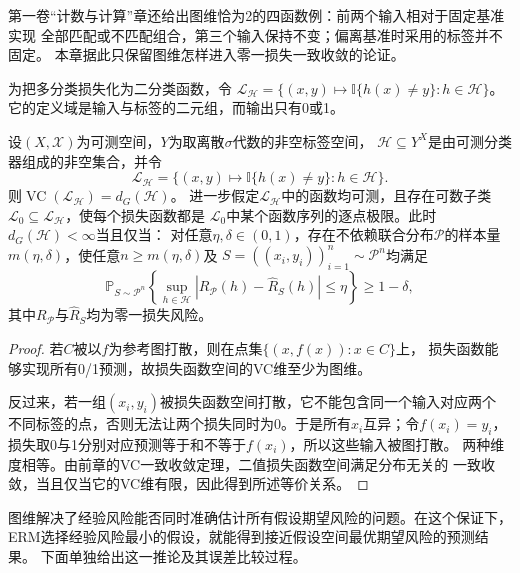 第一卷“计数与计算”章还给出图维恰为2的四函数例：前两个输入相对于固定基准实现
全部匹配或不匹配组合，第三个输入保持不变；偏离基准时采用的标签并不固定。
本章据此只保留图维怎样进入零一损失一致收敛的论证。

为把多分类损失化为二分类函数，令
$\mathcal L_{\mathcal H}=\{(x,y)\mapsto\mathbb I\{h(x)\neq y\}:h\in\mathcal H\}$。
它的定义域是输入与标签的二元组，而输出只有0或1。

\begin{theorem}[图维与一致收敛]
\label{thm:graph-uniform-convergence}
设$(X,\mathcal X)$为可测空间，$Y$为取离散$\sigma$代数的非空标签空间，
$\mathcal H\subseteq Y^X$是由可测分类器组成的非空集合，并令
\[
 \mathcal L_{\mathcal H}
 =\{(x,y)\mapsto\mathbb I\{h(x)\neq y\}:h\in\mathcal H\}.
\]
则$\operatorname{VC}(\mathcal L_{\mathcal H})=d_G(\mathcal H)$。
进一步假定$\mathcal L_{\mathcal H}$中的函数均可测，且存在可数子类
$\mathcal L_0\subseteq\mathcal L_{\mathcal H}$，使每个损失函数都是
$\mathcal L_0$中某个函数序列的逐点极限。此时$d_G(\mathcal H)<\infty$当且仅当：
对任意$\eta,\delta\in(0,1)$，存在不依赖联合分布$\mathcal P$的样本量
$m(\eta,\delta)$，使任意$n\geq m(\eta,\delta)$及
$S=((x_i,y_i))_{i=1}^n\sim\mathcal P^n$均满足
\[
 \mathbb P_{S\sim\mathcal P^n}\left\{
 \sup_{h\in\mathcal H}|R_{\mathcal P}(h)-\hat R_S(h)|\leq\eta
 \right\}\geq1-\delta,
\]
其中$R_{\mathcal P}$与$\hat R_S$均为零一损失风险。
\end{theorem}

\begin{proof}
若$C$被以$f$为参考图打散，则在点集$\{(x,f(x)):x\in C\}$上，
损失函数能够实现所有0/1预测，故损失函数空间的VC维至少为图维。

反过来，若一组$(x_i,y_i)$被损失函数空间打散，它不能包含同一个输入对应两个
不同标签的点，否则无法让两个损失同时为0。于是所有$x_i$互异；令$f(x_i)=y_i$，
损失取0与1分别对应预测等于和不等于$f(x_i)$，所以这些输入被图打散。
两种维度相等。由前章的VC一致收敛定理，二值损失函数空间满足分布无关的
一致收敛，当且仅当它的VC维有限，因此得到所述等价关系。
\end{proof}

图维解决了经验风险能否同时准确估计所有假设期望风险的问题。在这个保证下，
ERM选择经验风险最小的假设，就能得到接近假设空间最优期望风险的预测结果。
下面单独给出这一推论及其误差比较过程。


